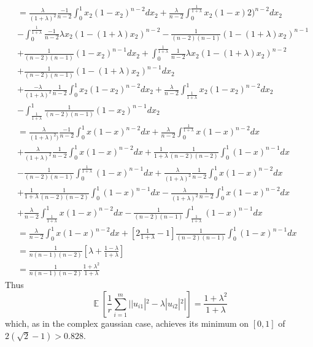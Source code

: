 \documentclass[11pt]{article}
\newcommand{\<}{\langle}
\renewcommand{\>}{\rangle}
\newcommand{\E}{\operatorname{\mathbb{E}}}
\numberwithin{equation}{section}
\begin{document}
\begin{align*}
&=\frac{\lambda}{(1+\lambda)^2}\frac{-1}{n-2}\int_{0}^1 x_2(1-x_2)^{n-2}dx_2 + \frac{\lambda}{n-2}\int_{0}^{\frac{1}{1+\lambda}}x_2(1-x)2)^{n-2}dx_2\\
&-\int_{0}^{\frac{1}{1+\lambda}} \frac{-1}{n-2}\lambda x_2(1-(1+\lambda)x_2)^{n-2} -\frac{1}{(n-2)(n-1)}(1-(1+\lambda)x_2)^{n-1} \\
&+ \frac{1}{(n-2)(n-1)}(1-x_2)^{n-1} dx_2 + \int_{0}^{\frac{1}{1+\lambda}} \frac{1}{n-2}\lambda x_2(1-(1+\lambda)x_2)^{n-2}\\
& + \frac{1}{(n-2)(n-1)}(1-(1+\lambda)x_2)^{n-1} dx_2\\
&+ \frac{-\lambda}{(1+\lambda)^2}\frac{1}{n-2} \int_{0}^{1} x_2(1-x_2)^{n-2} dx_2 + \frac{\lambda}{n-2}\int_{\frac{1}{1+\lambda}}^1 x_2(1-x_2)^{n-2} dx_2\\
&-\int_{\frac{1}{1+\lambda}}^1 \frac{1}{(n-2)(n-1)}(1-x_2)^{n-1} dx_2\\
&= \frac{\lambda}{(1+\lambda)^2)}\frac{-1}{n-2}\int_{0}^{1} x(1-x)^{n-2} dx + \frac{\lambda}{n-2}\int_{0}^{\frac{1}{1+\lambda}}x(1-x)^{n-2}dx\\
&+\frac{\lambda}{(1+\lambda)^2}\frac{1}{n-2}\int_{0}^{1} x(1-x)^{n-2} dx + \frac{1}{1+\lambda}\frac{1}{(n-2)(n-2)}\int_{0}^{1}(1-x)^{n-1}dx\\
&-\frac{1}{(n-2)(n-1)}\int_{0}^{\frac{1}{1+\lambda}}(1-x)^{n-1} dx + \frac{\lambda}{(1+\lambda)^2}\frac{1}{n-2}\int_{0}^{1} x(1-x)^{n-2} dx\\
&+ \frac{1}{1+\lambda}\frac{1}{(n-2)(n-2)}\int_{0}^{1}(1-x)^{n-1}dx -\frac{\lambda}{(1+\lambda)^2}\frac{1}{n-2}\int_{0}^{1} x(1-x)^{n-2} dx\\
&+\frac{\lambda}{n-2}\int_{\frac{1}{1+\lambda}}^1 x(1-x)^{n-2}dx - \frac{1}{(n-2)(n-1)}\int_{\frac{1}{1+\lambda}}^1 (1-x)^{n-1}dx\\
&= \frac{\lambda}{n-2}\int_{0}^1 x(1-x)^{n-2} dx + \left[ 2\frac{1}{1+\lambda} - 1 \right]\frac{1}{(n-2)(n-1)} \int_{0}^1 (1-x)^{n-1} dx \\
&=\frac{1}{n(n-1)(n-2)}\left[ \lambda + \frac{1-\lambda}{1+\lambda} \right]\\
&=\frac{1}{n(n-1)(n-2)}\frac{1+\lambda^2}{1+\lambda}
 \end{align*}
 Thus
 \[
\E\left[\frac{1}{r}\sum_{i=1}^{m} | |u_{i1}|^2 - \lambda |u_{i2}|^2 |   \right] = \frac{1+\lambda^2}{1+\lambda}
 \]
 which, as in the complex gaussian case, achieves its minimum on $\left[ 0,1\right]$ of $2(\sqrt{2}-1)>0.828$.\\
 
\end{document}
